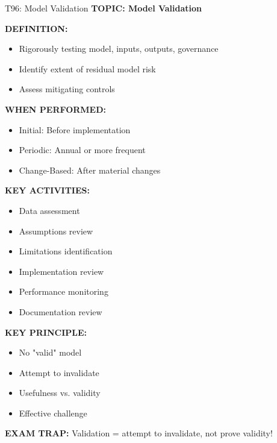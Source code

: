 \documentclass[8pt]{beamer}
\begin{document}
	\begin{frame}{T96: Model Validation}
		\fontsize{6.5}{7.5}\selectfont
		\textbf{TOPIC: Model Validation}
		
		\vspace{0.1cm}
		\textbf{DEFINITION:}
		\begin{itemize}
			\item Rigorously testing model, inputs, outputs, governance
			\item Identify extent of residual model risk
			\item Assess mitigating controls
		\end{itemize}
		
		\vspace{0.1cm}
		\textbf{WHEN PERFORMED:}
		\begin{itemize}
			\item \textcolor{myblue}{Initial:} Before implementation
			\item \textcolor{myblue}{Periodic:} Annual or more frequent
			\item \textcolor{myblue}{Change-Based:} After material changes
		\end{itemize}
		
		\vspace{0.1cm}
		\textbf{KEY ACTIVITIES:}
		\begin{itemize}
			\item Data assessment
			\item Assumptions review
			\item Limitations identification
			\item Implementation review
			\item Performance monitoring
			\item Documentation review
		\end{itemize}
		
		\vspace{0.1cm}
		\textbf{KEY PRINCIPLE:}
		\begin{itemize}
			\item No "valid" model
			\item Attempt to invalidate
			\item Usefulness vs. validity
			\item Effective challenge
		\end{itemize}
		
		\textcolor{myred}{\textbf{EXAM TRAP:}} Validation = \textcolor{myblue}{attempt to invalidate, not prove validity}!
	\end{frame}
	
\end{document}
